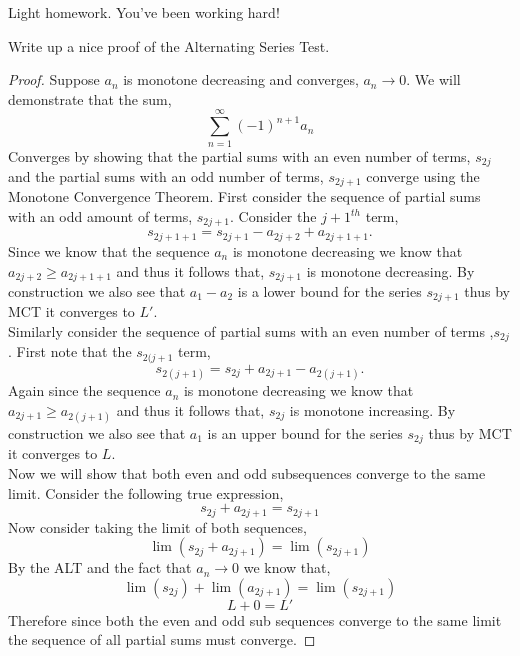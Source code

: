 \documentclass[12pt]{article}
\makeatletter
\theoremstyle{homework}
\newenvironment{exercise}[1]
{\def\@currentlabel{#1}\exercisecore}
{\endexercisecore}
\makeatother
\begin{document}
Light homework.  You've been working hard!

\begin{exercise}{Supplemental 1} Write up a nice proof of the Alternating
Series Test.

\begin{proof} Suppose $a_n$ is monotone decreasing and converges, $a_n \to 0$. We will demonstrate
  that the sum,
  \begin{equation*}
    \sum_{n = 1}^{\infty} (-1)^{n+1}a_n
  \end{equation*}
  Converges by showing that the partial sums with an even number of terms, $s_{2j}$ and the partial
  sums with an odd number of terms, $s_{2j+1}$ converge using the Monotone Convergence Theorem. First consider the
  sequence of partial sums with an odd amount of terms, $s_{2j+1}$. Consider the $j+1^{th}$ term,
  \begin{equation*}
    s_{2{j+1}+1} = s_{2{j}+1} - a_{2j + 2} + a_{2{j+1}+1}.
  \end{equation*}
Since we know that the sequence $a_n$ is monotone decreasing we know that $a_{2j + 2} \geq a_{2{j+1}+1}$ and thus it follows that,
$s_{2j+1}$ is monotone decreasing. By construction we also see that $a_1 - a_2$ is a lower bound for the series $s_{2j+1}$ thus by MCT it converges to $L'$. \\

Similarly consider the sequence of partial sums with an even number of terms ,$s_{2j}$. First note that the $s_{2(j+1}$ term,
\begin{equation*}
  s_{2(j+1)} = s_{2j} + a_{2j+1} - a_{2(j+1)}.
\end{equation*} 
Again since the sequence $a_n$ is monotone decreasing we know that $a_{2j+1} \geq a_{2(j+1)}$ and thus it follows that,
$s_{2j}$ is monotone increasing. By construction we also see that $a_1$ is an upper bound for the series $s_{2j}$ thus by MCT it converges to $L$.\\

Now we will show that both even and odd subsequences converge to the same limit. Consider the following true expression,
\begin{equation*}
  s_{2j} + a_{2j+1} = s_{2j+1} 
\end{equation*}
Now consider taking the limit of both sequences,
\begin{equation*}
  \lim (s_{2j} + a_{2j+1}) = \lim(s_{2j+1}) 
\end{equation*}
By the ALT and the fact that $a_n \to 0$ we know that,
\begin{equation*}
  \lim (s_{2j}) + \lim(a_{2j+1}) = \lim(s_{2j+1})
\end{equation*}
\begin{equation*}
  L + 0 = L'
\end{equation*}
Therefore since both the even and odd sub sequences converge to the same limit the sequence of all partial sums must converge.

\end{proof}

\end{exercise}
\end{document}
